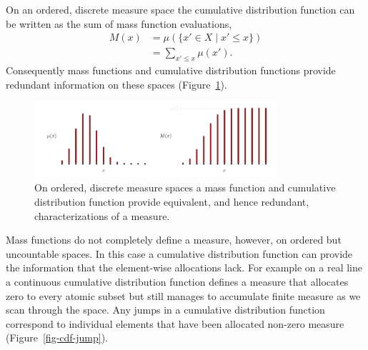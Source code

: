 \documentclass[
  letterpaper,
  DIV=11,
  numbers=noendperiod]{scrartcl}
\begin{document}
On an ordered, discrete measure space the cumulative distribution
function can be written as the sum of mass function evaluations,
\begin{align*}
M(x)
&= \mu(\{ x' \in X \mid x' \le x \})
\\
&= \sum_{x' \le x} \mu(x').
\end{align*} Consequently mass functions and cumulative distribution
functions provide redundant information on these spaces
(Figure~\ref{fig-discrete-cdf}).

\begin{figure}

{\centering \includegraphics[width=0.8\textwidth,height=\textheight]{figures/cdfs/discrete_cdf/discrete_cdf.pdf}

}

\caption{\label{fig-discrete-cdf}On ordered, discrete measure spaces a
mass function and cumulative distribution function provide equivalent,
and hence redundant, characterizations of a measure.}

\end{figure}

Mass functions do not completely define a measure, however, on ordered
but uncountable spaces. In this case a cumulative distribution function
can provide the information that the element-wise allocations lack. For
example on a real line a continuous cumulative distribution function
defines a measure that allocates zero to every atomic subset but still
manages to accumulate finite measure as we scan through the space. Any
jumps in a cumulative distribution function correspond to individual
elements that have been allocated non-zero measure
(Figure~\ref{fig-cdf-jump}).
\end{document}
